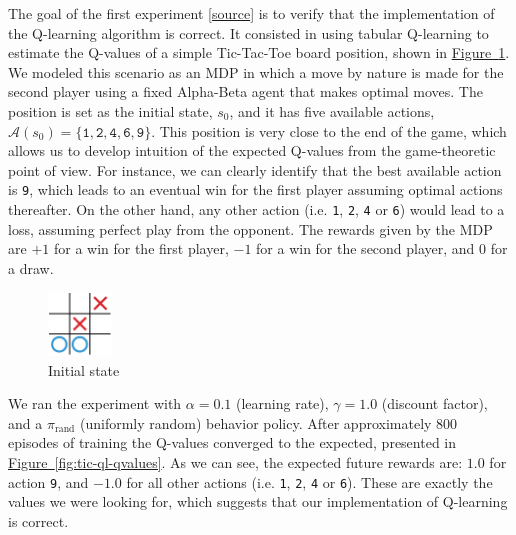 \documentclass{article}
\newcommand{\GithubURL}[1]{[\href{https://github.com/davidrobles/mlnd-capstone-code/blob/master/#1}{source}]}
\begin{document}

The goal of the first experiment \GithubURL{experiments/tic_ql_tab_simple.py} is to verify that the
implementation of the Q-learning algorithm is correct. It consisted in using tabular Q-learning to
estimate the Q-values of a simple Tic-Tac-Toe board position, shown in \hyperref[fig:tic-ql-tab-cur]
{Figure~\ref*{fig:tic-ql-tab-cur}}. We modeled this scenario as an MDP in which a move by nature is
made for the second player using a fixed Alpha-Beta agent that makes optimal moves. The position is
set as the initial state, $s_0$, and it has five available actions, $\mathcal{A}(s_0) =
\{\texttt{1}, \texttt{2}, \texttt{4}, \texttt{6}, \texttt{9}\}$. This position is very close to the
end of the game, which allows us to develop intuition of the expected Q-values from the
game-theoretic point of view. For instance, we can clearly identify that the best available action
is \texttt{9}, which leads to an eventual win for the first player assuming optimal actions
thereafter. On the other hand, any other action (i.e.  \texttt{1}, \texttt{2}, \texttt{4} or
\texttt{6}) would lead to a loss, assuming perfect play from the opponent.  The rewards given by the
MDP are $+1$ for a win for the first player, $-1$ for a win for the second player, and $0$ for a
draw.


\begin{figure}[!h]
    \centering
    \includegraphics[width=0.15\textwidth]{figures/tic_ql_tab_current.pdf}
    \caption{Initial state}
    \label{fig:tic-ql-tab-cur}
\end{figure}

We ran the experiment with $\alpha = 0.1$ (learning rate), $\gamma=1.0$ (discount factor), and a
$\pi_{\textrm{rand}}$ (uniformly random) behavior policy. After approximately 800 episodes of
training the Q-values converged to the expected, presented in \hyperref[fig:tic-ql-qvalues]
{Figure~\ref*{fig:tic-ql-qvalues}}. As we can see, the expected future rewards are: $1.0$ for action
\texttt{9}, and $-1.0$ for all other actions (i.e. \texttt{1}, \texttt{2}, \texttt{4} or
\texttt{6}). These are exactly the values we were looking for, which suggests that our
implementation of Q-learning is correct.
\end{document}
